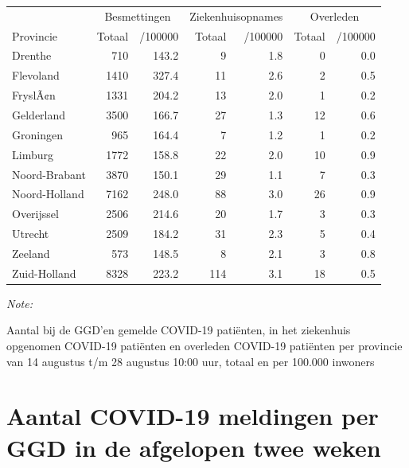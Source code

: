 \documentclass[
  english,
  man,floatsintext]{apa6}
\begin{document}
\begin{table}
\centering
\begin{threeparttable}
\begin{tabular}{lrrrrrr}
\toprule
\multicolumn{1}{c}{ } & \multicolumn{2}{c}{Besmettingen} & \multicolumn{2}{c}{Ziekenhuisopnames} & \multicolumn{2}{c}{Overleden} \\
\cmidrule(l{3pt}r{3pt}){2-3} \cmidrule(l{3pt}r{3pt}){4-5} \cmidrule(l{3pt}r{3pt}){6-7}
Provincie & Totaal & /100000 & Totaal & /100000 & Totaal & /100000\\
\midrule
Drenthe & 710 & 143.2 & 9 & 1.8 & 0 & 0.0\\
Flevoland & 1410 & 327.4 & 11 & 2.6 & 2 & 0.5\\
FryslÃ¢n & 1331 & 204.2 & 13 & 2.0 & 1 & 0.2\\
Gelderland & 3500 & 166.7 & 27 & 1.3 & 12 & 0.6\\
Groningen & 965 & 164.4 & 7 & 1.2 & 1 & 0.2\\
Limburg & 1772 & 158.8 & 22 & 2.0 & 10 & 0.9\\
Noord-Brabant & 3870 & 150.1 & 29 & 1.1 & 7 & 0.3\\
Noord-Holland & 7162 & 248.0 & 88 & 3.0 & 26 & 0.9\\
Overijssel & 2506 & 214.6 & 20 & 1.7 & 3 & 0.3\\
Utrecht & 2509 & 184.2 & 31 & 2.3 & 5 & 0.4\\
Zeeland & 573 & 148.5 & 8 & 2.1 & 3 & 0.8\\
Zuid-Holland & 8328 & 223.2 & 114 & 3.1 & 18 & 0.5\\
\bottomrule
\end{tabular}
\begin{tablenotes}
\item \textit{Note: } 
\item Aantal bij de GGD’en gemelde COVID-19 patiënten, in het ziekenhuis opgenomen COVID-19 patiënten en overleden COVID-19 patiënten per provincie van 14 augustus t/m 28 augustus 10:00 uur, totaal en per 100.000 inwoners
\end{tablenotes}
\end{threeparttable}
\end{table}

\newpage

\hypertarget{aantal-covid-19-meldingen-per-ggd-in-de-afgelopen-twee-weken}{%
\section{Aantal COVID-19 meldingen per GGD in de afgelopen twee weken}\label{aantal-covid-19-meldingen-per-ggd-in-de-afgelopen-twee-weken}}
\end{document}

